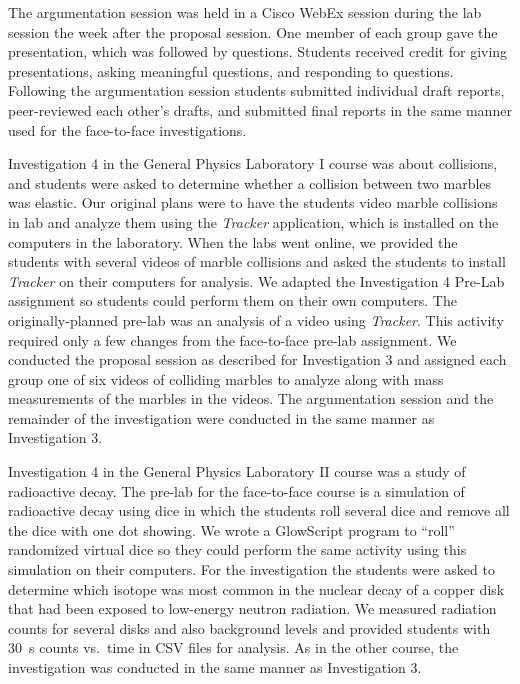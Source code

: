 \documentclass[aip, numerical, preprint]{revtex4-2}
\begin{document}
The argumentation session was held in a Cisco WebEx session during the lab session the week
after the proposal session. One member of each group gave the presentation, which was followed
by questions. Students received credit for giving presentations, asking meaningful questions,
and responding to questions.  Following the argumentation session students submitted individual
draft reports, peer-reviewed each other's drafts, and submitted final reports in the same
manner used for the face-to-face investigations.

Investigation 4 in the General Physics Laboratory I course was about collisions, and students
were asked to determine whether a collision between two marbles was elastic. Our original plans
were to have the students video marble collisions in lab and analyze them using the
\emph{Tracker} application\citep{bro2009}, which is installed on the computers in the
laboratory. When the labs went online, we provided the students with several videos of marble
collisions and asked the students to install \emph{Tracker} on their computers for analysis.
We adapted the Investigation 4 Pre-Lab assignment so students could perform them on their own
computers. The originally-planned pre-lab was an analysis of a video using \emph{Tracker}. This
activity required only a few changes from the face-to-face pre-lab assignment. We conducted the
proposal session as described for Investigation 3 and assigned each group one of six videos of
colliding marbles to analyze along with mass measurements of the marbles in the videos. The
argumentation session and the remainder of the investigation were conducted in the same manner
as Investigation 3.

Investigation 4 in the General Physics Laboratory II course was a study of radioactive
decay. The pre-lab for the face-to-face course is a simulation of radioactive decay using dice
in which the students roll several dice and remove all the dice with one dot showing. We wrote
a GlowScript\citep{glowscript} program to ``roll'' randomized virtual dice so they could
perform the same activity using this simulation on their computers. For the investigation the
students were asked to determine which isotope was most common in the nuclear decay of a copper
disk that had been exposed to low-energy neutron radiation. We measured radiation counts for
several disks and also background levels and provided students with \SI{30}{s} counts vs.\ time
in CSV files for analysis. As in the other course, the investigation was conducted in the same
manner as Investigation 3.
\end{document}
